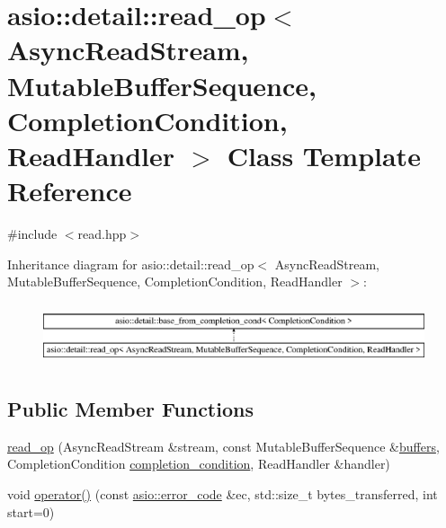 \hypertarget{classasio_1_1detail_1_1read__op}{}\section{asio\+:\+:detail\+:\+:read\+\_\+op$<$ Async\+Read\+Stream, Mutable\+Buffer\+Sequence, Completion\+Condition, Read\+Handler $>$ Class Template Reference}
\label{classasio_1_1detail_1_1read__op}


{\ttfamily \#include $<$read.\+hpp$>$}

Inheritance diagram for asio\+:\+:detail\+:\+:read\+\_\+op$<$ Async\+Read\+Stream, Mutable\+Buffer\+Sequence, Completion\+Condition, Read\+Handler $>$\+:\begin{figure}[H]
\begin{center}
\leavevmode
\includegraphics[height=1.830065cm]{classasio_1_1detail_1_1read__op}
\end{center}
\end{figure}
\subsection*{Public Member Functions}
\begin{DoxyCompactItemize}
\item 
\hyperlink{classasio_1_1detail_1_1read__op_ac145e93f691e7eed0379ac75e87b9d33}{read\+\_\+op} (Async\+Read\+Stream \&stream, const Mutable\+Buffer\+Sequence \&\hyperlink{group__async__read_ga54dede45c3175148a77fe6635222c47d}{buffers}, Completion\+Condition \hyperlink{group__async__read_gae2e215d5013596cc2b385bb6c13fa518}{completion\+\_\+condition}, Read\+Handler \&handler)
\item 
void \hyperlink{classasio_1_1detail_1_1read__op_a1c66ba50081c1767641da3accd757b3b}{operator()} (const \hyperlink{classasio_1_1error__code}{asio\+::error\+\_\+code} \&ec, std\+::size\+\_\+t bytes\+\_\+transferred, int start=0)
\end{DoxyCompactItemize}
